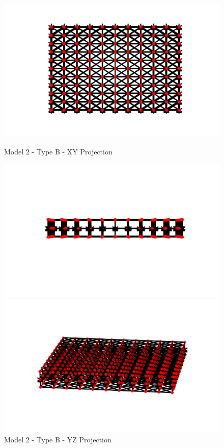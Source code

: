 \begin{figure}[!htbp]
\begin{minipage}{0.3\textwidth}
    \centering
    \includegraphics[width = 1\textwidth]{Figures/M2_b_XY.png}
    \caption{Model 2 - Type B - XY Projection}
    \label{fig:M2_b_XY}
\end{minipage}
\hspace{5mm}
\begin{minipage}{0.3\textwidth}
    \centering
    \includegraphics[width = 1\textwidth]{Figures/M2_b_YZ.png}
    \caption{Model 2 - Type B - YZ Projection}
    \label{fig:M2_b_YZ}
\end{minipage}
\hspace{5mm}
\begin{minipage}{0.3\textwidth}
    \centering
    \includegraphics[width = 1\textwidth]{Figures/M2_b_3D.png}

\end{minipage}
\end{figure}
